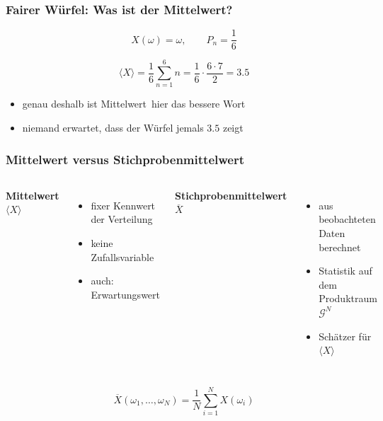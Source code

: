 \documentclass[aspectratio=169,professionalfonts]{beamer}
\begin{document}
\begin{frame}[plain]
\end{frame}

\begin{frame}
  \frametitle{Fairer W\"urfel: Was ist der Mittelwert?}

  \[
    X(\omega)=\omega,\qquad P_n=\frac{1}{6}
  \]

  \vspace{0.35cm}

  \[
    \langle X\rangle
    =\frac{1}{6}\sum_{n=1}^{6} n
    =\frac{1}{6}\cdot\frac{6\cdot 7}{2}
    =3.5
  \]

  \vspace{0.35cm}

  \begin{itemize}
    \item genau deshalb ist \glqq Mittelwert\grqq\ hier das bessere Wort
    \item niemand erwartet, dass der W\"urfel jemals \(3.5\) zeigt
  \end{itemize}
\end{frame}

\begin{frame}
  \frametitle{Mittelwert versus Stichprobenmittelwert}

  \begin{columns}[T,onlytextwidth]
    \textbf{Mittelwert \(\langle X\rangle\)}
    \begin{itemize}
      \item fixer Kennwert der Verteilung
      \item keine Zufallsvariable
      \item auch: Erwartungswert
    \end{itemize}

    \textbf{Stichprobenmittelwert \(\overline X\)}
    \begin{itemize}
      \item aus beobachteten Daten berechnet
      \item Statistik auf dem Produktraum \(\mathcal G^N\)
      \item Sch\"atzer für \(\langle X\rangle\)
    \end{itemize}
  \end{columns}

  \vspace{0.3cm}

  \[
    \overline X(\omega_1,\ldots,\omega_N)=\frac{1}{N}\sum_{i=1}^{N}X(\omega_i)
  \]
\end{frame}
\end{document}
